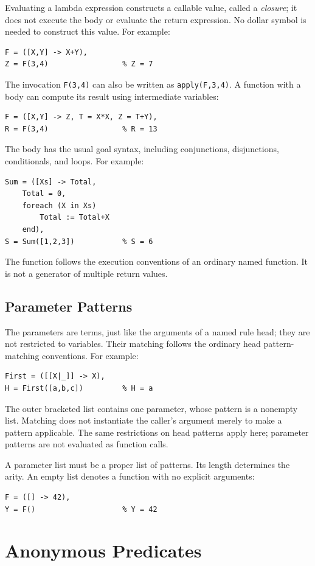 Evaluating a lambda expression constructs a callable value, called a
\emph{closure}; it does not execute the body or evaluate the return expression.
No dollar symbol is needed to construct this value. For example:
\begin{verbatim}
F = ([X,Y] -> X+Y),
Z = F(3,4)                 % Z = 7
\end{verbatim}
The invocation \texttt{F(3,4)} can also be written as
\texttt{apply(F,3,4)}. A function with a body can compute its result using
intermediate variables:
\begin{verbatim}
F = ([X,Y] -> Z, T = X*X, Z = T+Y),
R = F(3,4)                 % R = 13
\end{verbatim}
The body has the usual goal syntax, including conjunctions, disjunctions,
conditionals, and loops. For example:
\begin{verbatim}
Sum = ([Xs] -> Total,
    Total = 0,
    foreach (X in Xs)
        Total := Total+X
    end),
S = Sum([1,2,3])           % S = 6
\end{verbatim}
The function follows the execution conventions of an ordinary named function.
It is not a generator of multiple return values.

\subsection{Parameter Patterns}
The parameters are terms, just like the arguments of a named rule head; they
are not restricted to variables. Their matching follows the ordinary head
pattern-matching conventions. For example:
\begin{verbatim}
First = ([[X|_]] -> X),
H = First([a,b,c])         % H = a
\end{verbatim}
The outer bracketed list contains one parameter, whose pattern is a nonempty
list. Matching does not instantiate the caller's argument merely to make a
pattern applicable. The same restrictions on head patterns apply here;
parameter patterns are not evaluated as function calls.

A parameter list must be a proper list of patterns. Its length determines the
arity. An empty list denotes a function with no explicit arguments:
\begin{verbatim}
F = ([] -> 42),
Y = F()                    % Y = 42
\end{verbatim}

\section{Anonymous Predicates}
\label{section:anonymous-predicates}

